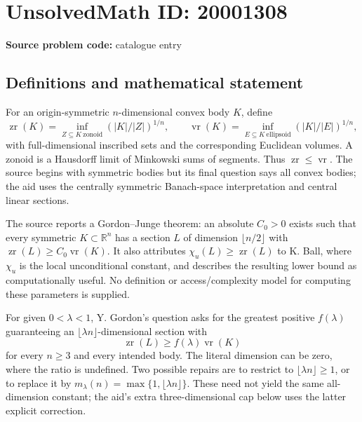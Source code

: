 \documentclass[11pt]{article}
\newcommand{\R}{\mathbb{R}}
\begin{document}
\section*{UnsolvedMath ID: 20001308}
\textbf{Source problem code:} catalogue entry
\subsection{Definitions and mathematical statement}
For an origin-symmetric \(n\)-dimensional convex body \(K\), define
\[
 \operatorname{zr}(K)=\inf_{Z\subseteq K\ \mathrm{zonoid}}
 (|K|/|Z|)^{1/n},\qquad
 \operatorname{vr}(K)=\inf_{E\subseteq K\ \mathrm{ellipsoid}}
 (|K|/|E|)^{1/n},
\]
with full-dimensional inscribed sets and the corresponding Euclidean volumes. A zonoid is a Hausdorff limit of Minkowski sums of segments. Thus \(\operatorname{zr}\le\operatorname{vr}\). The source begins with symmetric bodies but its final question says all convex bodies; the aid uses the centrally symmetric Banach-space interpretation and central linear sections.

The source reports a Gordon--Junge theorem: an absolute \(C_0>0\) exists such that every symmetric \(K\subset\R^n\) has a section \(L\) of dimension \(\lfloor n/2\rfloor\) with \(\operatorname{zr}(L)\ge C_0\operatorname{vr}(K)\). It also attributes \(\chi_u(L)\ge\operatorname{zr}(L)\) to K. Ball, where \(\chi_u\) is the local unconditional constant, and describes the resulting lower bound as computationally useful. No definition or access/complexity model for computing these parameters is supplied.

For given \(0<\lambda<1\), Y. Gordon's question asks for the greatest positive \(f(\lambda)\) guaranteeing an \(\lfloor\lambda n\rfloor\)-dimensional section with
\[
 \operatorname{zr}(L)\ge f(\lambda)\operatorname{vr}(K)
\]
for every \(n\ge3\) and every intended body. The literal dimension can be zero, where the ratio is undefined. Two possible repairs are to restrict to \(\lfloor\lambda n\rfloor\ge1\), or to replace it by \(m_\lambda(n)=\max\{1,\lfloor\lambda n\rfloor\}\). These need not yield the same all-dimension constant; the aid's extra three-dimensional cap below uses the latter explicit correction.
\end{document}
